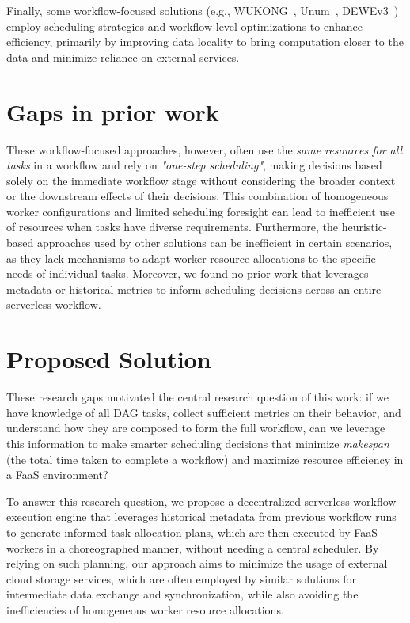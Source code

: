 Finally, some workflow-focused solutions (e.g., WUKONG~\cite{wukong_2}, Unum~\cite{unum_decentralized_orchestrator}, DEWEv3~\cite{dewe_v3}) employ scheduling strategies and workflow-level optimizations to enhance efficiency, primarily by improving data locality to bring computation closer to the data and minimize reliance on external services.

\section{Gaps in prior work}
These workflow-focused approaches, however, often use the \textit{same resources for all tasks} in a workflow and rely on \textit{"one-step scheduling"}, making decisions based solely on the immediate workflow stage without considering the broader context or the downstream effects of their decisions. This combination of homogeneous worker configurations and limited scheduling foresight can lead to inefficient use of resources when tasks have diverse requirements. Furthermore, the heuristic-based approaches used by other solutions can be inefficient in certain scenarios, as they lack mechanisms to adapt worker resource allocations to the specific needs of individual tasks. Moreover, we found no prior work that leverages metadata or historical metrics to inform scheduling decisions across an entire serverless workflow.


\section{Proposed Solution}
These research gaps motivated the central research question of this work: if we have knowledge of all DAG tasks, collect sufficient metrics on their behavior, and understand how they are composed to form the full workflow, can we leverage this information to make smarter scheduling decisions that minimize \textit{makespan} (the total time taken to complete a workflow) and maximize resource efficiency in a FaaS environment?

To answer this research question, we propose a decentralized serverless workflow execution engine that leverages historical metadata from previous workflow runs to generate informed task allocation plans, which are then executed by FaaS workers in a choreographed manner, without needing a central scheduler. By relying on such planning, our approach aims to minimize the usage of external cloud storage services, which are often employed by similar solutions for intermediate data exchange and synchronization, while also avoiding the inefficiencies of homogeneous worker resource allocations.

